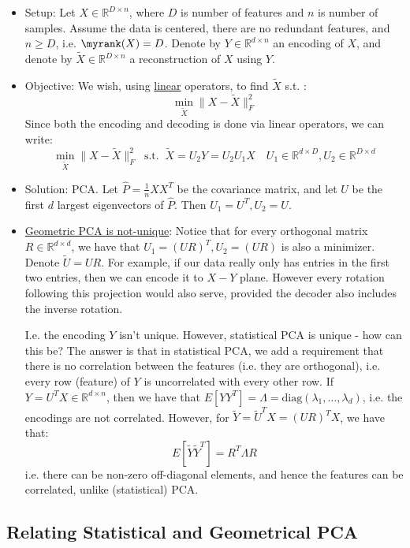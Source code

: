 \documentclass{article}
\begin{document}
\begin{itemize}

  \item Setup: Let $X \in \mathbb{R}^{D \times  n}$, where $D$ is number of features and $n$ is number of samples. Assume the data is centered, there are no redundant features, and $n \geq D$, i.e. $\myrank(X) = D$.  Denote by $Y \in \mathbb{R}^{d \times  n}$ an encoding of $X$, and denote by   $\widetilde{X} \in \mathbb{R}^{D \times  n}$ a reconstruction of $X$ using $Y$.
  \item Objective: We wish, using \ul{linear} operators, to find $\widetilde{X}$ s.t. :
  \[
    \min_{\widetilde{X}} \lVert X - \widetilde{X} \rVert_{F}^2
  \]
Since both the encoding and decoding is done via linear operators, we can write:
\[
  \min_{\widetilde{X}} \lVert X - \widetilde{X} \rVert_{F}^2 \ \text{ s.t. } \ \widetilde{X} = U_{2}Y = U_{2} U_{1}X \quad  U_1 \in \mathbb{R}^{d \times  D}, U_2 \in \mathbb{R}^{D \times d}
\]
  \item Solution: PCA. Let $\hat{P} = \frac{1}{n} X X^{T}$ be the covariance matrix, and let $U$ be the first $d$ largest eigenvectors of $\hat{P}$. Then $U_1 = U ^{T}, U_2 = U$. 
  \item \ul{Geometric PCA is not-unique}: Notice that for every orthogonal matrix $R \in \mathbb{R}^{d \times d}$, we have that $U_1 = (UR)^{T}, U_2 = (UR)$ is also a minimizer.  Denote $\widetilde{U}=UR$. 
For example, if our data really only has entries in the first two entries, then we can encode it to $X-Y$ plane. 
However every rotation following this projection would also serve, provided the decoder also includes the inverse rotation. 

I.e. the encoding $Y$ isn't unique.  
However, statistical PCA is unique - how can this be? 
The answer is that in statistical PCA, we add a requirement that there is no correlation between the features (i.e. they are orthogonal), i.e. every row (feature) of $Y$ is uncorrelated with every other row. 
  If $Y = U^{T} X \in \mathbb{R}^{d \times  n}$, then we have that $E[Y Y ^{T}] = \Lambda = \text{diag}(\lambda_1, \ldots, \lambda_{d})$, i.e. the encodings are not correlated. However, for $\widetilde{Y} = \widetilde{U}^{T} X = (UR)^{T} X$, we have that:
\[
  E[\widetilde{Y} \widetilde{Y}^{T} ] = R^{T} \Lambda R
\]
  i.e. there can be non-zero off-diagonal elements, and hence the features can be  correlated, unlike (statistical) PCA. 
\end{itemize}

\subsection{Relating Statistical and Geometrical PCA}
\end{document}
